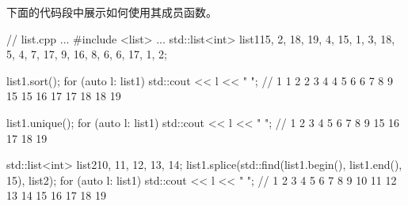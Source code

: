 下面的代码段中展示如何使用其成员函数。


\begin{cpp}
// list.cpp
...
#include <list>
...
std::list<int> list1{15, 2, 18, 19, 4, 15, 1, 3, 18, 5,
	                  4, 7, 17, 9, 16, 8, 6, 6, 17, 1, 2};
	                  
list1.sort();
for (auto l: list1) std::cout << l << " ";
	// 1 1 2 2 3 4 4 5 6 6 7 8 9 15 15 16 17 17 18 18 19

list1.unique();
for (auto l: list1) std::cout << l << " ";
	// 1 2 3 4 5 6 7 8 9 15 16 17 18 19

std::list<int> list2{10, 11, 12, 13, 14};
list1.splice(std::find(list1.begin(), list1.end(), 15), list2);
for (auto l: list1) std::cout << l << " ";
	// 1 2 3 4 5 6 7 8 9 10 11 12 13 14 15 16 17 18 19
\end{cpp}


